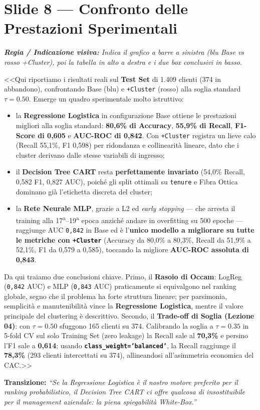 \documentclass[10pt, a4paper]{article}
\newcommand{\cue}[1]{%
  \par\vspace{2pt}\noindent\colorbox{CueBg}{\parbox{\dimexpr\linewidth-2\fboxsep}{\footnotesize\textit{\color{PrimaryNavy}\textbf{Regia / Indicazione visiva:} #1}}}\par\vspace{3pt}%
}
\newcommand{\transition}[1]{%
  \par\vspace{2pt}\noindent\colorbox{LightBg}{\parbox{\dimexpr\linewidth-2\fboxsep}{\small\textbf{\color{SecondaryBlue}Transizione:} \textit{``#1''}}}\par\vspace{4pt}%
}
\begin{document}
\section*{Slide 8 --- Confronto delle Prestazioni Sperimentali}
\cue{Indica il grafico a barre a sinistra (blu Base vs rosso +Cluster), poi la tabella in alto a destra e i due box conclusivi in basso.}
\noindent <<Qui riportiamo i risultati reali sul \textbf{Test Set} di 1.409 clienti (374 in abbandono), confrontando Base (blu) e \texttt{+Cluster} (rosso) alla soglia standard $\tau=0.50$. Emerge un quadro sperimentale molto istruttivo:
\begin{itemize}
    \item la \textbf{Regressione Logistica} in configurazione Base ottiene le prestazioni migliori alla soglia standard: \textbf{80,6\% di Accuracy}, \textbf{55,9\% di Recall}, \textbf{F1-Score di 0,605} e \textbf{AUC-ROC di 0,842}. Con \texttt{+Cluster} registra un lieve calo (Recall 55,1\%, F1 0,598) per ridondanza e collinearità lineare, dato che i cluster derivano dalle stesse variabili di ingresso;
    \item il \textbf{Decision Tree CART} resta \textbf{perfettamente invariato} (54,0\% Recall, 0,582 F1, 0,827 AUC), poiché gli split ottimali su \texttt{tenure} e Fibra Ottica dominano già l'etichetta discreta del cluster;
    \item la \textbf{Rete Neurale MLP}, grazie a L2 ed \textit{early stopping} --- che arresta il training alla 17\textsuperscript{a}--19\textsuperscript{a} epoca anziché andare in overfitting su 500 epoche --- raggiunge AUC \texttt{0,842} in Base ed è l'\textbf{unico modello a migliorare su tutte le metriche con \texttt{+Cluster}} (Accuracy da 80,0\% a 80,3\%, Recall da 51,9\% a 52,1\%, F1 da 0,579 a 0,585), toccando la migliore \textbf{AUC-ROC assoluta di 0,843}.
\end{itemize}
Da qui traiamo due conclusioni chiave. Primo, il \textbf{Rasoio di Occam}: LogReg (\texttt{0,842} AUC) e MLP (\texttt{0,843} AUC) praticamente si equivalgono nel ranking globale, segno che il problema ha forte struttura lineare; per parsimonia, semplicità e manutenibilità vince la \textbf{Regressione Logistica}, mentre il valore principale del clustering è descrittivo. Secondo, il \textbf{Trade-off di Soglia (Lezione 04)}: con $\tau=0.50$ sfuggono 165 clienti su 374. Calibrando la soglia a \textbf{$\tau=0.35$} in 5-fold CV sul solo Training Set (zero leakage) la Recall sale al \textbf{70,3\%} e persino l'F1 sale a \textbf{0,614}; usando \textbf{\texttt{class\_weight='balanced'}}, la Recall raggiunge il \textbf{78,3\%} (293 clienti intercettati su 374), allineandosi all'asimmetria economica del CAC.>>
\transition{Se la Regressione Logistica è il nostro motore preferito per il ranking probabilistico, il Decision Tree CART ci offre qualcosa di insostituibile per il management aziendale: la piena spiegabilità White-Box.}
\end{document}
